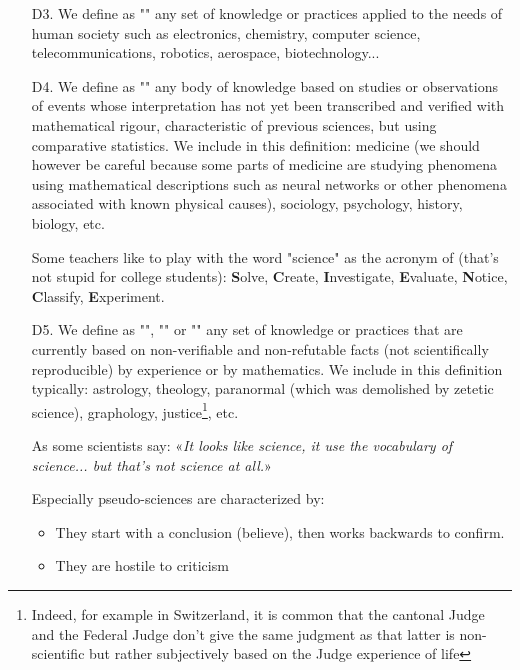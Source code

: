 \begin{itemize}
	\item[D3.] We define as "" any set of knowledge or practices applied to the needs of human society such as electronics, chemistry, computer science, telecommunications, robotics, aerospace, biotechnology... 

	\item[D4.] We define as "" any body of knowledge based on studies or observations of events whose interpretation has not yet been transcribed and verified with mathematical rigour, characteristic of previous sciences, but using comparative statistics. We include in this definition: medicine (we should however be careful because some parts of medicine are studying phenomena using mathematical descriptions such as neural networks or other phenomena associated with known physical causes), sociology, psychology, history, biology, etc.
	
	Some teachers like to play with the word "science" as the acronym of (that's not stupid for college students): \textbf{S}olve, \textbf{C}reate, \textbf{I}nvestigate, \textbf{E}valuate, \textbf{N}otice, \textbf{C}lassify, \textbf{E}xperiment.

	\item[D5.] We define as "", "" or "" any set of knowledge or practices that are currently based on non-verifiable and non-refutable facts (not scientifically reproducible) by experience or by mathematics. We include in this definition typically: astrology, theology, paranormal (which was demolished by zetetic science), graphology, justice\footnote{Indeed, for example in Switzerland, it is common that the cantonal Judge and the Federal Judge don't give the same judgment as that latter is non-scientific but rather subjectively based on the Judge experience of life}, etc. 
	
	As some scientists say: «\textit{It looks like science, it use the vocabulary of science... but that's not science at all.}»
	
	Especially pseudo-sciences are characterized by:
	\begin{itemize}
		\item They start with a conclusion (believe), then works backwards to confirm.

		\item They are hostile to criticism


\end{itemize}
\end{itemize}
